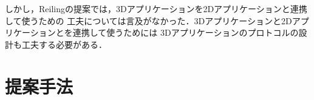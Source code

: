 しかし，Reilingの提案では，3Dアプリケーションを2Dアプリケーションと連携して使うための
工夫については言及がなかった．3Dアプリケーションと2Dアプリケーションとを連携して使うためには
3Dアプリケーションのプロトコルの設計も工夫する必要がある．



\section{提案手法}







